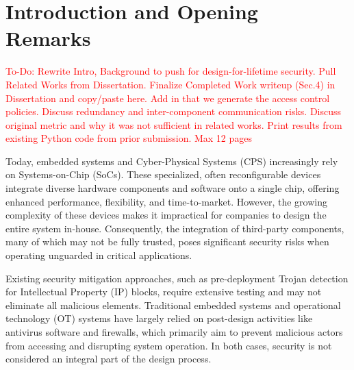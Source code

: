 

\label{ch:introduction}\section{Introduction and Opening Remarks} 

\textcolor{red}{To-Do: Rewrite Intro, Background to push for design-for-lifetime security. Pull Related Works from Dissertation. Finalize Completed Work writeup (Sec.4) in Dissertation and copy/paste here. Add in that we generate the access control policies. Discuss redundancy and inter-component communication risks. Discuss original metric and why it was not sufficient in related works. Print results from existing Python code from prior submission. Max 12 pages}

Today, embedded systems and Cyber-Physical Systems (CPS) increasingly rely on Systems-on-Chip (SoCs). These specialized, often reconfigurable devices integrate diverse hardware components and software onto a single chip, offering enhanced performance, flexibility, and time-to-market. However, the growing complexity of these devices makes it impractical for companies to design the entire system in-house. Consequently, the integration of third-party components, many of which may not be fully trusted, poses significant security risks when operating unguarded in critical applications.

Existing security mitigation approaches, such as pre-deployment Trojan detection for Intellectual Property (IP) blocks, require extensive testing and may not eliminate all malicious elements. Traditional embedded systems and operational technology (OT) systems have largely relied on post-design activities like antivirus software and firewalls, which primarily aim to prevent malicious actors from accessing and disrupting system operation. In both cases, security is not considered an integral part of the design process. 

